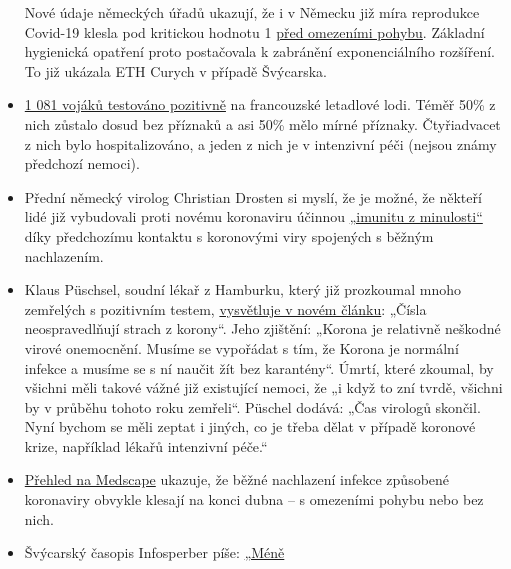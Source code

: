 \begin{itemize}
  Nové údaje německých úřadů ukazují, že i v Německu již míra reprodukce
  Covid-19 klesla pod kritickou hodnotu 1
  \href{https://www.rki.de/DE/Content/Infekt/EpidBull/Archiv/2020/Ausgaben/17_20_SARS-CoV2_vorab.pdf?__blob=publicationFile\#page=5}{před
  omezeními pohybu}. Základní hygienická opatření proto postačovala k
  zabránění exponenciálního rozšíření. To již ukázala ETH Curych v
  případě Švýcarska.
\item
  \href{https://www.ouest-france.fr/sante/virus/coronavirus/coronavirus-au-moins-940-marins-positifs-sur-le-charles-de-gaulle-et-son-escorte-6810816}{1
  081 vojáků testováno pozitivně} na francouzské letadlové lodi. Téměř
  50\% z nich zůstalo dosud bez příznaků a asi 50\% mělo mírné příznaky.
  Čtyřiadvacet z nich bylo hospitalizováno, a jeden z nich je v
  intenzivní péči (nejsou známy předchozí nemoci).
\item
  Přední německý virolog Christian Drosten si myslí, že je možné, že
  někteří lidé již vybudovali proti novému koronaviru účinnou
  \href{https://www.watson.de/!324026684}{„imunitu z minulosti``} díky
  předchozímu kontaktu s koronovými viry spojených s běžným nachlazením.
\item
  Klaus Püschsel, soudní lékař z Hamburku, který již prozkoumal mnoho
  zemřelých s pozitivním testem,
  \href{https://www.abendblatt.de/hamburg/article228908865/hamburg-corona-virus-uke-infektion-covid-19-pueschel-coronavirus-krise-patienten-impfstoff-immunitaet-krankenhaeuser-kontaktverbot-kliniken-infektionsrate-krankheit-pandemie-test-lungenkrankheit-sars-cov-epidemie-sars-cov-2.html}{vysvětluje
  v novém článku}: „Čísla neospravedlňují strach z korony``. Jeho
  zjištění: „Korona je relativně neškodné virové onemocnění. Musíme se
  vypořádat s tím, že Korona je normální infekce a musíme se s ní naučit
  žít bez karantény``. Úmrtí, které zkoumal, by všichni měli takové
  vážné již existující nemoci, že „i když to zní tvrdě, všichni by v
  průběhu tohoto roku zemřeli``. Püschel dodává: „Čas virologů skončil.
  Nyní bychom se měli zeptat i jiných, co je třeba dělat v případě
  koronové krize, například lékařů intenzivní péče.``
\item
  \href{https://emedicine.medscape.com/article/227820-overview}{Přehled
  na Medscape} ukazuje, že běžné nachlazení infekce způsobené koronaviry
  obvykle klesají na konci dubna -- s omezeními pohybu nebo bez nich.
\item
  Švýcarský časopis Infosperber píše:
  \href{https://www.infosperber.ch/Artikel/Gesundheit/Weniger-Corona-Falle-Einfach-weniger-testen}{„Méně
}
\end{itemize}
